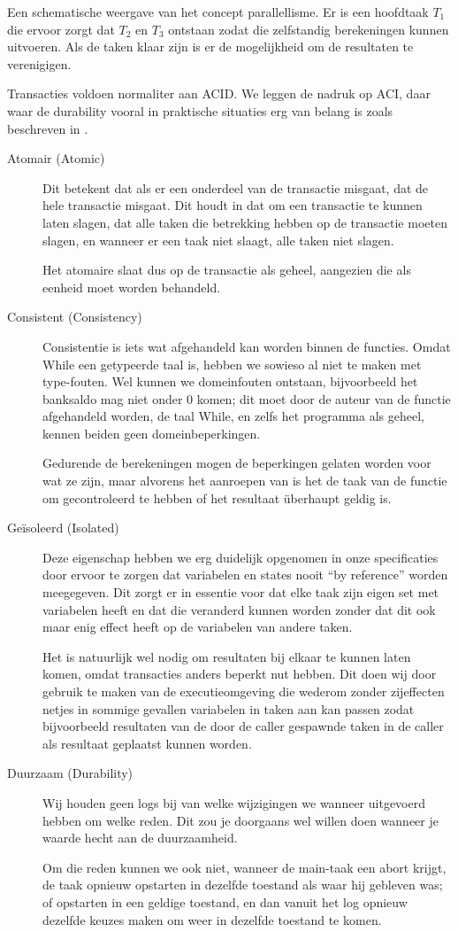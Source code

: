 Een schematische weergave van het concept parallellisme. Er is een hoofdtaak \(T_1\) die ervoor zorgt dat \(T_2\) en
\(T_3\) ontstaan zodat die zelfstandig berekeningen kunnen uitvoeren. Als de taken klaar zijn is er de mogelijkheid om
de resultaten te verenigigen.

Transacties voldoen normaliter aan ACID. We leggen de nadruk op ACI, daar waar de durability vooral in praktische
situaties erg van belang is zoals beschreven in \cite{TransactionConcept}.
\begin{description}
\item[Atomair (Atomic)] Dit betekent dat als er een onderdeel van de transactie misgaat, dat de hele transactie
misgaat. Dit houdt in dat om een transactie te kunnen laten slagen, dat alle taken die betrekking hebben op de
transactie moeten slagen, en wanneer er een taak niet slaagt, alle taken niet slagen.

Het atomaire slaat dus op de transactie als geheel, aangezien die als eenheid moet worden behandeld.
\item[Consistent (Consistency)] Consistentie is iets wat afgehandeld kan worden binnen de functies. Omdat While een
getypeerde taal is, hebben we sowieso al niet te maken met type-fouten. Wel kunnen we domeinfouten ontstaan,
bijvoorbeeld het banksaldo mag niet onder \(0\) komen; dit moet door de auteur van de functie afgehandeld worden, de
taal While, en zelfs het programma als geheel, kennen beiden geen domeinbeperkingen.

Gedurende de berekeningen mogen de beperkingen gelaten worden voor wat ze zijn, maar alvorens het aanroepen van
 is het de taak van de functie om gecontroleerd te hebben of het resultaat \"uberhaupt geldig is.
\item[Ge\"isoleerd (Isolated)] Deze eigenschap hebben we erg duidelijk opgenomen in onze specificaties door ervoor te
zorgen dat variabelen en states nooit ``by reference'' worden meegegeven. Dit zorgt er in essentie voor dat elke taak
zijn eigen set met variabelen heeft en dat die veranderd kunnen worden zonder dat dit ook maar enig effect heeft op de
variabelen van andere taken.

Het is natuurlijk wel nodig om resultaten bij elkaar te kunnen laten komen, omdat transacties anders beperkt nut
hebben. Dit doen wij door gebruik te maken van de executieomgeving die wederom zonder zijeffecten netjes in sommige
gevallen variabelen in taken aan kan passen zodat bijvoorbeeld resultaten van de door de caller gespawnde taken in de
caller als resultaat geplaatst kunnen worden.
\item[Duurzaam (Durability)] Wij houden geen logs bij van welke wijzigingen we wanneer uitgevoerd hebben om welke
reden. Dit zou je doorgaans wel willen doen wanneer je waarde hecht aan de duurzaamheid.

Om die reden kunnen we ook niet, wanneer de main-taak een abort krijgt, de taak opnieuw opstarten in dezelfde toestand
als waar hij gebleven was; of opstarten in een geldige toestand, en dan vanuit het log opnieuw dezelfde keuzes maken om
weer in dezelfde toestand te komen.
\end{description}

